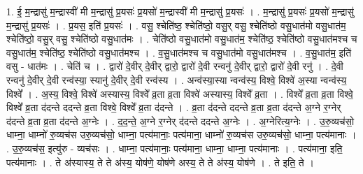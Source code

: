 \documentclass[17pt]{extarticle}
\begin{document}
1. ई॒ म॒न्द्रासु॑ म॒न्द्रास्वी॑ मी म॒न्द्रासु॑ प्र॒यसः॑ प्र॒यसो॑ म॒न्द्रास्वी॑ मी म॒न्द्रासु॑ प्र॒यसः॑ । . म॒न्द्रासु॑ प्र॒यसः॑ प्र॒यसो॑ म॒न्द्रासु॑ म॒न्द्रासु॑ प्र॒यसः॑ । . प्र॒यस॒ इति॑ प्र॒यसः॑ । . वसु॒ श्चेति॑ष्ठ॒ श्चेति॑ष्ठो॒ वसु॒र् वसु॒ श्चेति॑ष्ठो वसु॒धात॑मो वसु॒धात॑म॒ श्चेति॑ष्ठो॒ वसु॒र् वसु॒ श्चेति॑ष्ठो वसु॒धात॑मः । . चेति॑ष्ठो वसु॒धात॑मो वसु॒धात॑म॒ श्चेति॑ष्ठ॒ श्चेति॑ष्ठो वसु॒धात॑मश्च च वसु॒धात॑म॒ श्चेति॑ष्ठ॒ श्चेति॑ष्ठो वसु॒धात॑मश्च । . व॒सु॒धात॑मश्च च वसु॒धात॑मो वसु॒धात॑मश्च । . व॒सु॒धात॑म॒ इति॑ वसु - धात॑मः । . चेति॑ च । . द्वारो॑ दे॒वीर् दे॒वीर् द्वारो॒ द्वारो॑ दे॒वी रन्वनु॑ दे॒वीर् द्वारो॒ द्वारो॑ दे॒वी रनु॑ । . दे॒वी रन्वनु॑ दे॒वीर् दे॒वी रन्व॑स्या॒ स्यानु॑ दे॒वीर् दे॒वी रन्व॑स्य । . अन्व॑स्या॒स्या न्वन्व॑स्य॒ विश्वे॒ विश्वे॑ अ॒स्या न्वन्व॑स्य॒ विश्वे᳚ । . अ॒स्य॒ विश्वे॒ विश्वे॑ अस्यास्य॒ विश्वे᳚ व्र॒ता व्र॒ता विश्वे॑ अस्यास्य॒ विश्वे᳚ व्र॒ता । . विश्वे᳚ व्र॒ता व्र॒ता विश्वे॒ विश्वे᳚ व्र॒ता द॑दन्ते ददन्ते व्र॒ता विश्वे॒ विश्वे᳚ व्र॒ता द॑दन्ते । . व्र॒ता द॑दन्ते ददन्ते व्र॒ता व्र॒ता द॑दन्ते अ॒ग्ने र॒ग्नेर् द॑दन्ते व्र॒ता व्र॒ता द॑दन्ते अ॒ग्नेः । . द॒द॒न्ते॒ अ॒ग्ने र॒ग्नेर् द॑दन्ते ददन्ते अ॒ग्नेः । . अ॒ग्नेरित्य॒ग्नेः । . उ॒रु॒व्यच॑सो॒ धाम्ना॒ धाम्नो॑ रु॒व्यच॑स उरु॒व्यच॑सो॒ धाम्ना॒ पत्य॑मानाः॒ पत्य॑माना॒ धाम्नो॑ रु॒व्यच॑स उरु॒व्यच॑सो॒ धाम्ना॒ पत्य॑मानाः । . उ॒रु॒व्यच॑स॒ इत्यु॑रु - व्यच॑सः । . धाम्ना॒ पत्य॑मानाः॒ पत्य॑माना॒ धाम्ना॒ धाम्ना॒ पत्य॑मानाः । . पत्य॑माना॒ इति॒ पत्य॑मानाः । . ते अ॑स्यास्य॒ ते ते अ॑स्य॒ योष॑णे॒ योष॑णे अस्य॒ ते ते अ॑स्य॒ योष॑णे । . ते इति॒ ते । \newline
\end{document}
